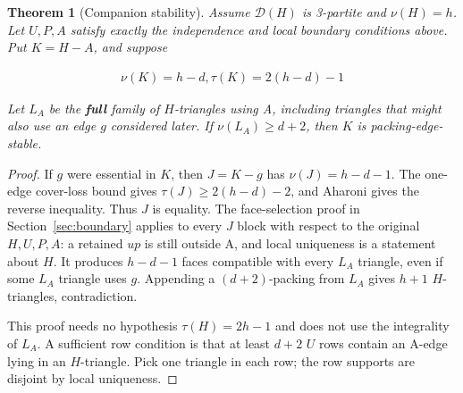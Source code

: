 \documentclass[11pt]{article}
\newtheorem{theorem}{Theorem}[section]
\theoremstyle{definition}\newtheorem{definition}[theorem]{Definition}
\theoremstyle{remark}\newtheorem{remark}[theorem]{Remark}
\begin{document}
\begin{theorem}[Companion stability]\label{thm:stability}
Assume \(\mathcal D(H)\) is 3-partite and \(\nu(H)=h\). Let \(U,P,A\) satisfy exactly the independence and local boundary conditions above. Put \(K=H-A\), and suppose

\begin{equation}
\begin{gathered}
\nu(K)=h-d, \tau(K)=2(h-d)-1
\end{gathered}
\end{equation}

Let \(L_A\) be the \textbf{full} family of \(H\)-triangles using A, including triangles that might also use an edge \(g\) considered later. If \(\nu(L_A)\ge d+2\), then \(K\) is packing-edge-stable.
\end{theorem}
\begin{proof}\leavevmode
If \(g\) were essential in \(K\), then \(J=K-g\) has \(\nu(J)=h-d-1\). The one-edge cover-loss bound gives \(\tau(J)\ge 2(h-d)-2\), and Aharoni gives the reverse inequality. Thus \(J\) is equality. The face-selection proof in Section~\ref{sec:boundary} applies to every \(J\) block with respect to the original \(H,U,P,A\): a retained \(up\) is still outside A, and local uniqueness is a statement about \(H\). It produces \(h-d-1\) faces compatible with every \(L_A\) triangle, even if some \(L_A\) triangle uses \(g\). Appending a \((d+2)\)-packing from \(L_A\) gives \(h+1\) \(H\)-triangles, contradiction.

This proof needs no hypothesis \(\tau(H)=2h-1\) and does not use the integrality of \(L_A\). A sufficient row condition is that at least \(d+2\) \(U\) rows contain an A-edge lying in an \(H\)-triangle. Pick one triangle in each row; the row supports are disjoint by local uniqueness.
\end{proof}
\end{document}
